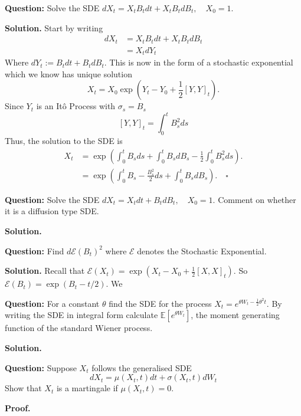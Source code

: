 \documentclass{article}
\begin{document}
\begin{tcolorbox}[colframe=black,colback=gray!5,boxrule=0.5pt]
\textbf{Question:} Solve the SDE $dX_t = X_tB_tdt + X_tB_tdB_t, \quad X_0=1$.
\end{tcolorbox}
\textbf{Solution.} Start by writing
\begin{align*}
    dX_t &= X_tB_tdt + X_tB_tdB_t \\
    &= X_tdY_t
\end{align*}
Where $dY_t := B_tdt + B_tdB_t$. This is now in the form of a stochastic exponential which we know has unique solution
$$X_t = X_0\exp\left(Y_t - Y_0 + \frac{1}{2}[Y,Y]_t\right).$$
Since $Y_t$ is an Itô Process with $\sigma_s = B_s$
$$[Y,Y]_t = \int_0^t B_s^2 ds$$
Thus, the solution to the SDE is 
\begin{align*}
    X_t &= \exp\left( \int_0^tB_sds + \int_0^t B_sdB_s - \frac{1}{2}\int_0^t B_s^2ds\right). \\
    &= \exp\left( \int_0^tB_s - \frac{B_s^2}{2}ds + \int_0^t B_sdB_s \right). \quad \square
\end{align*}

\begin{tcolorbox}[colframe=black,colback=gray!5,boxrule=0.5pt]
\textbf{Question:} Solve the SDE $dX_t = X_t dt + B_tdB_t, \quad X_0=1$. Comment on whether it is a diffusion type SDE. 
\end{tcolorbox}
\textbf{Solution.} 


\begin{tcolorbox}[colframe=black,colback=gray!5,boxrule=0.5pt]
\textbf{Question:} Find $d\mathcal{E}(B_t)^2$ where $\mathcal{E}$ denotes the Stochastic Exponential.
\end{tcolorbox}
\textbf{Solution.} Recall that $\mathcal{E}(X_t) = \exp(X_t - X_0 + \frac{1}{2}[X,X]_t)$. So $\mathcal{E}(B_t) = \exp(B_t - t/2).$ We 

\begin{tcolorbox}[colframe=black,colback=gray!5,boxrule=0.5pt]
\textbf{Question:} For a constant $\theta$ find the SDE for the process $X_t = e^{\theta W_t - \frac{1}{2}\theta^2 t}$. By writing the SDE in integral form calculate $\mathbb{E}[e^{\theta W_t}]$, the moment generating function of the standard Wiener process. 
\end{tcolorbox}
\textbf{Solution.}

\begin{tcolorbox}[colframe=black,colback=gray!5,boxrule=0.5pt]
\textbf{Question:} Suppose $X_t$ follows the generalised SDE 
$$dX_t = \mu(X_t,t)dt + \sigma(X_t,t)dW_t$$
Show that $X_t$ is a martingale if $\mu(X_t,t)=0.$
\end{tcolorbox}
\textbf{Proof.}
\end{document}
